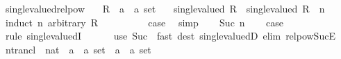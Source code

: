 \begin{isabellebody}
\ single{\isacharunderscore}{\kern0pt}valued{\isacharunderscore}{\kern0pt}relpow{\isacharcolon}{\kern0pt}\isanewline
\ \ \ R\ {\isacharcolon}{\kern0pt}{\isacharcolon}{\kern0pt}\ {\isachardoublequoteopen}{\isacharparenleft}{\kern0pt}{\isacharprime}{\kern0pt}a\ {\isasymtimes}\ {\isacharprime}{\kern0pt}a{\isacharparenright}{\kern0pt}\ set{\isachardoublequoteclose}\isanewline
\ \ \ {\isachardoublequoteopen}single{\isacharunderscore}{\kern0pt}valued\ R\ {\isasymLongrightarrow}\ single{\isacharunderscore}{\kern0pt}valued\ {\isacharparenleft}{\kern0pt}R\ {\isacharcircum}{\kern0pt}{\isacharcircum}{\kern0pt}\ n{\isacharparenright}{\kern0pt}{\isachardoublequoteclose}\isanewline
%
\isadelimproof
%
\endisadelimproof
%
\isatagproof
{}\isamarkupfalse%
\ {\isacharparenleft}{\kern0pt}induct\ n\ arbitrary{\isacharcolon}{\kern0pt}\ R{\isacharparenright}{\kern0pt}\isanewline
\ \ \isamarkupfalse%
\ {}\isanewline
\ \ \isamarkupfalse%
\ \isamarkupfalse%
\ {\isacharquery}{\kern0pt}case\ \isamarkupfalse%
\ simp\isanewline
{}\isamarkupfalse%
\isanewline
\ \ \isamarkupfalse%
\ {\isacharparenleft}{\kern0pt}Suc\ n{\isacharparenright}{\kern0pt}\isanewline
\ \ \isamarkupfalse%
\ {\isacharquery}{\kern0pt}case\isanewline
\ \ \ \ \isamarkupfalse%
\ {\isacharparenleft}{\kern0pt}rule\ single{\isacharunderscore}{\kern0pt}valuedI{\isacharparenright}{\kern0pt}\isanewline
\ \ \ \ \ \ {\isacharparenleft}{\kern0pt}use\ Suc\ \ {\isacartoucheopen}fast\ dest{\isacharcolon}{\kern0pt}\ single{\isacharunderscore}{\kern0pt}valuedD\ elim{\isacharcolon}{\kern0pt}\ relpow{\isacharunderscore}{\kern0pt}Suc{\isacharunderscore}{\kern0pt}E{\isacartoucheclose}{\isacharparenright}{\kern0pt}\isanewline
{}\isamarkupfalse%
%
\endisatagproof
{\isafoldproof}%
%
\isadelimproof
%
\endisadelimproof
%
\isadelimdocument
%
\endisadelimdocument
%
\isatagdocument
%
\isamarkuptrue%
%
\endisatagdocument
{\isafolddocument}%
%
\isadelimdocument
%
\endisadelimdocument
{}\isamarkupfalse%
\ ntrancl\ {\isacharcolon}{\kern0pt}{\isacharcolon}{\kern0pt}\ {\isachardoublequoteopen}nat\ {\isasymRightarrow}\ {\isacharparenleft}{\kern0pt}{\isacharprime}{\kern0pt}a\ {\isasymtimes}\ {\isacharprime}{\kern0pt}a{\isacharparenright}{\kern0pt}\ set\ {\isasymRightarrow}\ {\isacharparenleft}{\kern0pt}{\isacharprime}{\kern0pt}a\ {\isasymtimes}\ {\isacharprime}{\kern0pt}a{\isacharparenright}{\kern0pt}\ set{\isachardoublequoteclose}\isanewline

\end{isabellebody}
